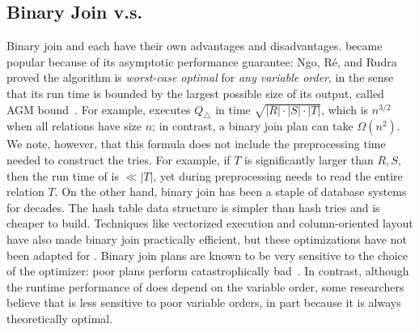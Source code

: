 \subsection{Binary Join v.s. \GJ}
Binary join and \GJ each have their own advantages and disadvantages.
\GJ became popular because of its asymptotic performance guarantee:
Ngo, R{\'{e}}, and Rudra~\cite{DBLP:journals/sigmod/NgoRR13} proved the algorithm is
\emph{worst-case optimal} for \emph{any variable order}, in the sense
that its run time is bounded by the largest possible size of its
output, called AGM bound~\cite{DBLP:journals/siamcomp/AtseriasGM13}.
For example, \GJ executes $Q_\triangle$ in time
$\sqrt{|R|\cdot |S| \cdot |T|}$, which is $n^{3/2}$ when all relations
have size $n$; in contrast, a binary join plan can take $\Omega(n^2)$.
We note, however, that this formula does not include the preprocessing
time needed to construct the tries.  For example, if $T$ is
significantly larger than $R, S$, then the run time of \GJ is
$\ll |T|$, yet during preprocessing \GJ needs to read the entire
relation $T$.  On the other hand, binary join has been a staple of
database systems for decades.  The hash table data structure is
simpler than hash tries and is cheaper to build.  Techniques like
vectorized execution and column-oriented layout have also made binary
join practically efficient, but these optimizations have not been
adapted for \GJ.  Binary join plans are known to be very sensitive to
the choice of the optimizer: poor plans perform catastrophically
bad~\cite{DBLP:journals/pvldb/LeisGMBK015}.  In contrast, although the
runtime performance of \GJ does depend on the variable order, some
researchers believe that \GJ is less sensitive to poor variable
orders, in part because it is always theoretically optimal.


